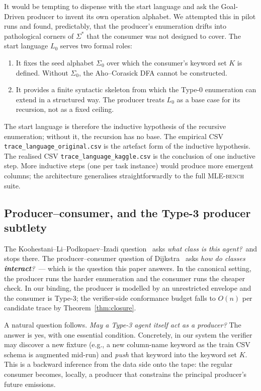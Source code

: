 It would be tempting to dispense with the start language and ask
the Goal-Driven producer to invent its own operation alphabet.
We attempted this in pilot runs and found, predictably, that the
producer's enumeration drifts into pathological corners of
$\Sigma^*$ that the consumer was not designed to cover.  The
start language $L_0$ serves two formal roles:
\begin{enumerate}
\item It fixes the seed alphabet $\Sigma_0$ over which the
consumer's keyword set $K$ is defined.  Without $\Sigma_0$, the
Aho--Corasick DFA cannot be constructed.
\item It provides a finite syntactic skeleton from which the
Type-0 enumeration can extend in a structured way.  The producer
treats $L_0$ as a base case for its recursion, not as a fixed
ceiling.
\end{enumerate}
The start language is therefore the inductive hypothesis of the
recursive enumeration; without it, the recursion has no base.
The empirical CSV \texttt{trace\_language\_original.csv} is the
artefact form of the inductive hypothesis.  The realised CSV
\texttt{trace\_language\_kaggle.csv} is the conclusion of one
inductive step.  More inductive steps (one per task instance)
would produce more emergent columns; the architecture
generalises straightforwardly to the full \textsc{MLE-bench}
suite.

\subsection{Producer--consumer, and the Type-3 producer subtlety}
\label{sec:type3-producer}

The Koohestani--Li--Podkopaev--Izadi
question~\cite{koohestani2025automata} asks \emph{what class is
this agent?}\ and stops there.  The producer--consumer
question of Dijkstra~\cite{dijkstra1968cooperating} asks
\emph{how do classes \textbf{interact}?}\ --- which is the
question this paper answers.  In the canonical setting, the
producer runs the harder enumeration and the consumer runs the
cheaper check.  In our binding, the producer is modelled by an unrestricted
envelope and the consumer is Type-3; the verifier-side conformance
budget falls to $O(n)$ per candidate trace by
Theorem~\ref{thm:closure}.

A natural question follows.  \emph{May a Type-3 agent itself act
as a producer?}  The answer is yes, with one essential condition.
Concretely, in our system the verifier may discover a new
fixture (e.g., a new column-name keyword as the train CSV schema
is augmented mid-run) and \emph{push} that keyword into the
keyword set $K$.  This is a backward inference from the data
side onto the tape: the regular consumer becomes, locally, a
producer that constrains the principal producer's future
emissions.

